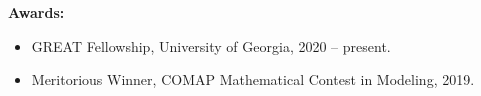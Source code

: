 \textbf{Awards:}

\begin{itemize}[noitemsep]
\item GREAT Fellowship, University of Georgia, 2020 -- present.
\item Meritorious Winner, COMAP Mathematical Contest in Modeling, 2019.
\end{itemize}